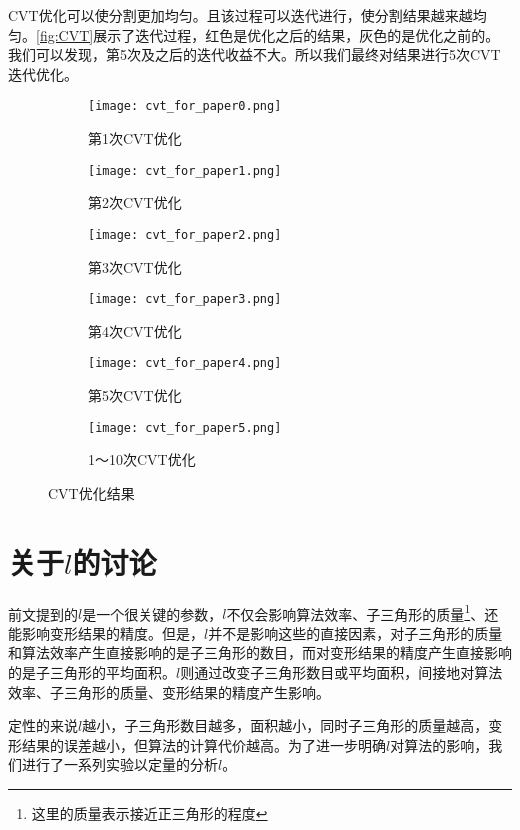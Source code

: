 CVT\cite{du1999}优化可以使分割更加均匀。且该过程可以迭代进行，使分割结果越来越均匀。\autoref{fig:CVT}展示了迭代过程，红色是优化之后的结果，灰色的是优化之前的。我们可以发现，第5次及之后的迭代收益不大。所以我们最终对结果进行5次CVT迭代优化。

\begin{figure}[htbp]
	\centering
	\begin{subfigure}[b]{.49\textwidth}
		\centering
		\texttt{[image: cvt\_for\_paper0.png]}
		\caption{第1次CVT优化}
	\end{subfigure}
	\begin{subfigure}[b]{.49\textwidth}
		\centering
		\texttt{[image: cvt\_for\_paper1.png]}
		\caption{第2次CVT优化}
	\end{subfigure}

	\begin{subfigure}[b]{.49\textwidth}
		\centering
		\texttt{[image: cvt\_for\_paper2.png]}
		\caption{第3次CVT优化}
	\end{subfigure}
	\begin{subfigure}[b]{.49\textwidth}
		\centering
		\texttt{[image: cvt\_for\_paper3.png]}
		\caption{第4次CVT优化}
	\end{subfigure}

	\begin{subfigure}[b]{.49\textwidth}
		\centering
		\texttt{[image: cvt\_for\_paper4.png]}
		\caption{第5次CVT优化}
	\end{subfigure}
	\begin{subfigure}[b]{.49\textwidth}
		\centering
		\texttt{[image: cvt\_for\_paper5.png]}
		\caption{1～10次CVT优化}
	\end{subfigure}
    \caption{CVT优化结果} \label{fig:CVT}
\end{figure}

\section{关于$l$的讨论}
前文提到的$l$是一个很关键的参数，$l$不仅会影响算法效率、子三角形的质量\footnote{这里的质量表示接近正三角形的程度}、还能影响变形结果的精度。但是，$l$并不是影响这些的直接因素，对子三角形的质量和算法效率产生直接影响的是子三角形的数目，而对变形结果的精度产生直接影响的是子三角形的平均面积。$l$则通过改变子三角形数目或平均面积，间接地对算法效率、子三角形的质量、变形结果的精度产生影响。

定性的来说$l$越小，子三角形数目越多，面积越小，同时子三角形的质量越高，变形结果的误差越小，但算法的计算代价越高。为了进一步明确$l$对算法的影响，我们进行了一系列实验以定量的分析$l$。

